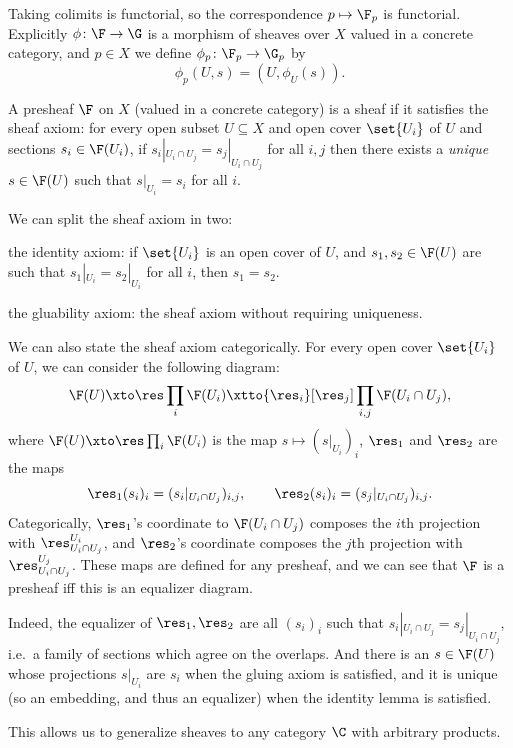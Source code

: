 \edefn

Taking colimits is functorial, so the correspondence $p\mapsto\F_p$ is functorial.
Explicitly $\phi\colon\F\to\G$ is a morphism of sheaves over $X$ valued in a concrete category, and $p\in X$ we define $\phi_p\colon\F_p\to\G_p$
by
$$ \phi_p(U,s) = (U,\phi_U(s)) . $$

\bdefn

    A presheaf $\F$ on $X$ (valued in a concrete category) is a {\emphcolor sheaf} if it satisfies the {\emphcolor sheaf axiom}:
    for every open subset $U\subseteq X$ and open cover $\set{U_i}$ of $U$ and sections $s_i\in\F(U_i)$, if $s_i|_{U_i\cap U_j}=s_j|_{U_i\cap U_j}$
    for all $i,j$ then there exists a {\it unique\/} $s\in\F(U)$ such that $s|_{U_i}=s_i$ for all $i$.

\edefn

We can split the sheaf axiom in two:
\benum
    \item the {\emphcolor identity axiom}: if $\set{U_i}$ is an open cover of $U$, and $s_1,s_2\in\F(U)$ are such that $s_1|_{U_i}=s_2|_{U_i}$
    for all $i$, then $s_1=s_2$.
    \item the {\emphcolor gluability axiom}: the sheaf axiom without requiring uniqueness.
\eenum

We can also state the sheaf axiom categorically.
For every open cover $\set{U_i}$ of $U$, we can consider the following diagram:
$$ \F(U) \xto\res \prod_i\F(U_i) \xtto{\res_i}[\res_j] \prod_{i,j}\F(U_i\cap U_j) , $$
where $\F(U)\xto\res\prod_i\F(U_i)$ is the map $s\mapsto(s|_{U_i})_i$, $\res_1$ and $\res_2$ are the maps
$$ \res_1(s_i)_i = (s_i|_{U_i\cap U_j})_{i,j},\qquad \res_2(s_i)_i = (s_j|_{U_i\cap U_j})_{i,j} . $$
Categorically, $\res_1$'s coordinate to $\F(U_i\cap U_j)$ composes the $i$th projection with $\res^{U_i}_{U_i\cap U_j}$, and $\res_2$'s
coordinate composes the $j$th projection with $\res^{U_j}_{U_i\cap U_j}$.
These maps are defined for any presheaf, and we can see that $\F$ is a presheaf iff this is an equalizer diagram.

Indeed, the equalizer of $\res_1,\res_2$ are all $(s_i)_i$ such that $s_i|_{U_i\cap U_j}=s_j|_{U_i\cap U_j}$, i.e.\ a family of sections which
agree on the overlaps.
And there is an $s\in\F(U)$ whose projections $s|_{U_i}$ are $s_i$ when the gluing axiom is satisfied, and it is unique (so an embedding, and thus
an equalizer) when the identity lemma is satisfied.

This allows us to generalize sheaves to any category $\C$ with arbitrary products.

